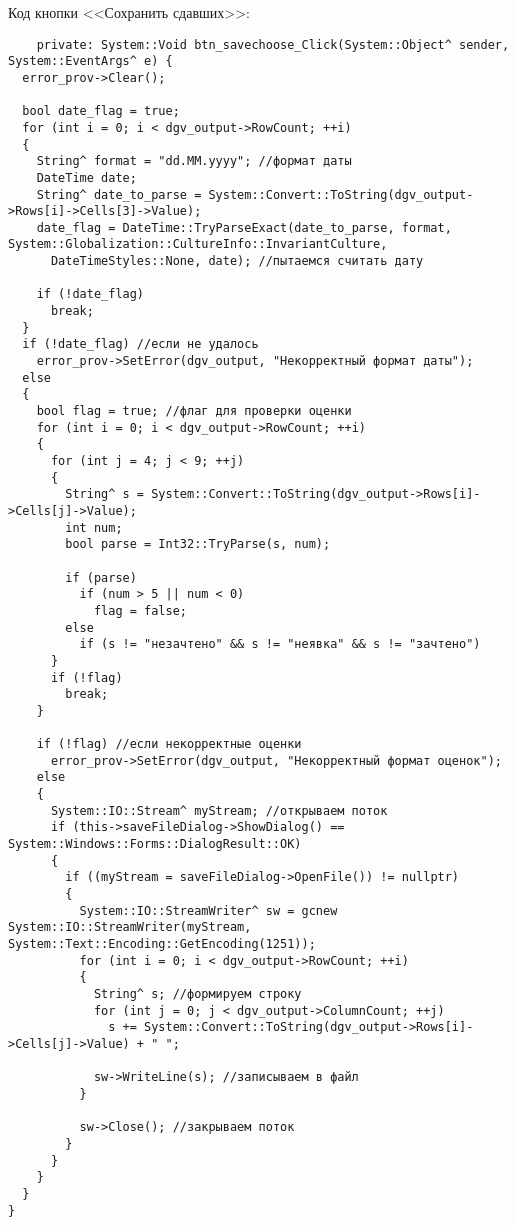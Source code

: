 Код кнопки <<Сохранить сдавших>>:
\begin{verbatim}
    private: System::Void btn_savechoose_Click(System::Object^ sender, System::EventArgs^ e) {
  error_prov->Clear();

  bool date_flag = true;
  for (int i = 0; i < dgv_output->RowCount; ++i)
  {
    String^ format = "dd.MM.yyyy"; //формат даты
    DateTime date;
    String^ date_to_parse = System::Convert::ToString(dgv_output->Rows[i]->Cells[3]->Value);
    date_flag = DateTime::TryParseExact(date_to_parse, format, System::Globalization::CultureInfo::InvariantCulture,
      DateTimeStyles::None, date); //пытаемся считать дату

    if (!date_flag)
      break;
  }
  if (!date_flag) //если не удалось
    error_prov->SetError(dgv_output, "Некорректный формат даты");
  else
  {
    bool flag = true; //флаг для проверки оценки
    for (int i = 0; i < dgv_output->RowCount; ++i)
    {
      for (int j = 4; j < 9; ++j)
      {
        String^ s = System::Convert::ToString(dgv_output->Rows[i]->Cells[j]->Value);
        int num;
        bool parse = Int32::TryParse(s, num);

        if (parse)
          if (num > 5 || num < 0)
            flag = false;
        else
          if (s != "незачтено" && s != "неявка" && s != "зачтено")
      }
      if (!flag)
        break;
    }

    if (!flag) //если некорректные оценки
      error_prov->SetError(dgv_output, "Некорректный формат оценок");
    else
    {
      System::IO::Stream^ myStream; //открываем поток
      if (this->saveFileDialog->ShowDialog() == System::Windows::Forms::DialogResult::OK)
      {
        if ((myStream = saveFileDialog->OpenFile()) != nullptr)
        {
          System::IO::StreamWriter^ sw = gcnew System::IO::StreamWriter(myStream, System::Text::Encoding::GetEncoding(1251));
          for (int i = 0; i < dgv_output->RowCount; ++i)
          {
            String^ s; //формируем строку
            for (int j = 0; j < dgv_output->ColumnCount; ++j)
              s += System::Convert::ToString(dgv_output->Rows[i]->Cells[j]->Value) + " ";

            sw->WriteLine(s); //записываем в файл
          }

          sw->Close(); //закрываем поток
        }
      }
    }
  }
}
\end{verbatim}
